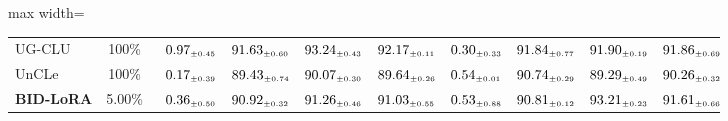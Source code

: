 \begin{table}[!htbp]
\begin{adjustbox}{max width=\textwidth}
\begin{tabular}{l|c|cccc|cccc}
UG-CLU & 100\% & $\kern6pt0.97_{\scriptscriptstyle \pm 0.45}\kern-6pt$ & \colorbox{yellow!35}{$\kern6pt91.63_{\scriptscriptstyle \pm 0.60}\kern-6pt$} & \colorbox{yellow!35}{$\kern6pt93.24_{\scriptscriptstyle \pm 0.43}\kern-6pt$} & \colorbox{yellow!35}{$\kern6pt92.17_{\scriptscriptstyle \pm 0.11}\kern-6pt$} & $\kern6pt0.30_{\scriptscriptstyle \pm 0.33}\kern-6pt$ & \colorbox{green!25}{$\kern6pt91.84_{\scriptscriptstyle \pm 0.77}\kern-6pt$} & $\kern6pt91.90_{\scriptscriptstyle \pm 0.19}\kern-6pt$ & \colorbox{yellow!35}{$\kern6pt91.86_{\scriptscriptstyle \pm 0.69}\kern-6pt$} \\
UnCLe & 100\% & $\kern6pt0.17_{\scriptscriptstyle \pm 0.39}\kern-6pt$ & $\kern6pt89.43_{\scriptscriptstyle \pm 0.74}\kern-6pt$ & $\kern6pt90.07_{\scriptscriptstyle \pm 0.30}\kern-6pt$ & $\kern6pt89.64_{\scriptscriptstyle \pm 0.26}\kern-6pt$ & $\kern6pt0.54_{\scriptscriptstyle \pm 0.01}\kern-6pt$ & $\kern6pt90.74_{\scriptscriptstyle \pm 0.29}\kern-6pt$ & $\kern6pt89.29_{\scriptscriptstyle \pm 0.49}\kern-6pt$ & $\kern6pt90.26_{\scriptscriptstyle \pm 0.32}\kern-6pt$ \\
\midrule
\rowcolor{pink!15}
\textbf{BID-LoRA} & 5.00\% & $\kern6pt0.36_{\scriptscriptstyle \pm 0.50}\kern-6pt$ & $\kern6pt90.92_{\scriptscriptstyle \pm 0.32}\kern-6pt$ & $\kern6pt91.26_{\scriptscriptstyle \pm 0.46}\kern-6pt$ & $\kern6pt91.03_{\scriptscriptstyle \pm 0.55}\kern-6pt$ & $\kern6pt0.53_{\scriptscriptstyle \pm 0.88}\kern-6pt$ & $\kern6pt90.81_{\scriptscriptstyle \pm 0.12}\kern-6pt$ & \colorbox{yellow!35}{$\kern6pt93.21_{\scriptscriptstyle \pm 0.23}\kern-6pt$} & $\kern6pt91.61_{\scriptscriptstyle \pm 0.66}\kern-6pt$ \\
\bottomrule
\end{tabular}
\end{adjustbox}
\end{table}
